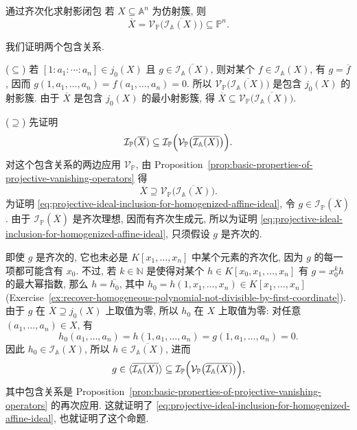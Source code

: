 \begin{Proposition}{通过齐次化求射影闭包}\leavevmode\label{prop:projective-closure-by-homogenizing-vanishing-ideal}
若 $X\subseteq\mathbb{A}^{n}$ 为仿射簇, 则
\[
  \overline{X}=\mathcal{V}_{\mathbb{P}}\bigl(\overline{\mathcal{I}_{\mathbb{A}}(X)}\bigr)\subseteq\mathbb{P}^{n}.
\]
\end{Proposition}
\begin{Proof}
我们证明两个包含关系.

($\subseteq$) 若 $[1:a_{1}:\cdots:a_{n}]\in j_{0}(X)$ 且 $g\in\overline{\mathcal{I}_{\mathbb{A}}(X)}$, 则对某个 $f\in\mathcal{I}_{\mathbb{A}}(X)$, 有 $g=\overline{f}$, 因而 $g(1,a_{1},\ldots,a_{n})=f(a_{1},\ldots,a_{n})=0$. 所以 $\mathcal{V}_{\mathbb{P}}\bigl(\overline{\mathcal{I}_{\mathbb{A}}(X)}\bigr)$ 是包含 $j_{0}(X)$ 的射影簇. 由于 $\overline{X}$ 是包含 $j_{0}(X)$ 的最小射影簇, 得 $\overline{X}\subseteq\mathcal{V}_{\mathbb{P}}\bigl(\overline{\mathcal{I}_{\mathbb{A}}(X)}\bigr)$.

($\supseteq$) 先证明
\begin{equation}\label{eq:projective-ideal-inclusion-for-homogenized-affine-ideal}
  \mathcal{I}_{\mathbb{P}}(\overline{X})\subseteq
  \mathcal{I}_{\mathbb{P}}\Bigl(\mathcal{V}_{\mathbb{P}}\bigl(\overline{\mathcal{I}_{\mathbb{A}}(X)}\bigr)\Bigr).
\end{equation}
对这个包含关系的两边应用 $\mathcal{V}_{\mathbb{P}}$, 由 Proposition~\ref{prop:basic-properties-of-projective-vanishing-operators} 得
\[
  \overline{X}\supseteq\mathcal{V}_{\mathbb{P}}\bigl(\overline{\mathcal{I}_{\mathbb{A}}(X)}\bigr).
\]
为证明 \eqref{eq:projective-ideal-inclusion-for-homogenized-affine-ideal}, 令 $g\in\mathcal{I}_{\mathbb{P}}(\overline{X})$. 由于 $\mathcal{I}_{\mathbb{P}}(\overline{X})$ 是齐次理想, 因而有齐次生成元, 所以为证明 \eqref{eq:projective-ideal-inclusion-for-homogenized-affine-ideal}, 只须假设 $g$ 是齐次的.

即使 $g$ 是齐次的, 它也未必是 $K[x_{1},\ldots,x_{n}]$ 中某个元素的齐次化, 因为 $g$ 的每一项都可能含有 $x_{0}$. 不过, 若 $k\in\mathbb{N}$ 是使得对某个 $h\in K[x_{0},x_{1},\ldots,x_{n}]$ 有 $g=x_{0}^{k}h$ 的最大幂指数, 那么 $h=\overline{h_{0}}$, 其中 $h_{0}=h(1,x_{1},\ldots,x_{n})\in K[x_{1},\ldots,x_{n}]$ (Exercise~\ref{ex:recover-homogeneous-polynomial-not-divisible-by-first-coordinate}). 由于 $g$ 在 $\overline{X}\supseteq j_{0}(X)$ 上取值为零, 所以 $h_{0}$ 在 $X$ 上取值为零: 对任意 $(a_{1},\ldots,a_{n})\in X$, 有
\[
  h_{0}(a_{1},\ldots,a_{n})=h(1,a_{1},\ldots,a_{n})=g(1,a_{1},\ldots,a_{n})=0.
\]
因此 $h_{0}\in\mathcal{I}_{\mathbb{A}}(X)$, 所以 $h\in\overline{\mathcal{I}_{\mathbb{A}}(X)}$, 进而
\[
  g\in\langle\overline{\mathcal{I}_{\mathbb{A}}(X)}\rangle
    \subseteq\mathcal{I}_{\mathbb{P}}\Bigl(\mathcal{V}_{\mathbb{P}}\bigl(\overline{\mathcal{I}_{\mathbb{A}}(X)}\bigr)\Bigr),
\]
其中包含关系是 Proposition~\ref{prop:basic-properties-of-projective-vanishing-operators} 的再次应用. 这就证明了 \eqref{eq:projective-ideal-inclusion-for-homogenized-affine-ideal}, 也就证明了这个命题.
\end{Proof}

